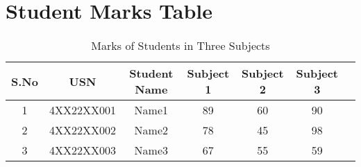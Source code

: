 \documentclass[a4paper,12pt]{article}
\begin{document}
\section*{Student Marks Table}
\begin{table}[h!]
\centering
\caption{Marks of Students in Three Subjects}
\begin{tabular}{|c|c|c|c|c|c|c|}
\hline
\textbf{S.No} & \textbf{USN} & \textbf{Student Name} & \textbf{Subject 1} & \textbf{Subject 2} & \textbf{Subject 3} \\
\hline
1 & 4XX22XX001 & Name1 & 89 & 60 & 90 \\
2 & 4XX22XX002 & Name2 & 78 & 45 & 98 \\
3 & 4XX22XX003 & Name3 & 67 & 55 & 59 \\
\hline
\end{tabular}
\end{table}
\end{document}
